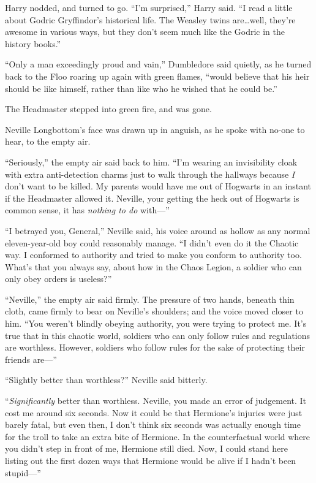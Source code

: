 Harry nodded, and turned to go. “I’m surprised,” Harry said. “I read a little about Godric Gryffindor’s historical life. The Weasley twins are…well, they’re awesome in various ways, but they don’t seem much like the Godric in the history books.”

“Only a man exceedingly proud and vain,” Dumbledore said quietly, as he turned back to the Floo roaring up again with green flames, “would believe that his heir should be like himself, rather than like who he wished that he could be.”

The Headmaster stepped into green fire, and was gone.


Neville Longbottom’s face was drawn up in anguish, as he spoke with no-one to hear, to the empty air.

“Seriously,” the empty air said back to him. “I’m wearing an invisibility cloak with extra anti-detection charms just to walk through the hallways because \emph{I} don’t want to be killed. My parents would have me out of Hogwarts in an instant if the Headmaster allowed it. Neville, your getting the heck out of Hogwarts is common sense, it has \emph{nothing to do} with—”

“I betrayed you, General,” Neville said, his voice around as hollow as any normal eleven-year-old boy could reasonably manage. “I didn’t even do it the Chaotic way. I conformed to authority and tried to make you conform to authority too. What’s that you always say, about how in the Chaos Legion, a soldier who can only obey orders is useless?”

“Neville,” the empty air said firmly. The pressure of two hands, beneath thin cloth, came firmly to bear on Neville’s shoulders; and the voice moved closer to him. “You weren’t blindly obeying authority, you were trying to protect me. It’s true that in this chaotic world, soldiers who can only follow rules and regulations are worthless. However, soldiers who follow rules for the sake of protecting their friends are—”

“Slightly better than worthless?” Neville said bitterly.

“\emph{Significantly} better than worthless. Neville, you made an error of judgement. It cost me around six seconds. Now it could be that Hermione’s injuries were just barely fatal, but even then, I don’t think six seconds was actually enough time for the troll to take an extra bite of Hermione. In the counterfactual world where you didn’t step in front of me, Hermione still died. Now, I could stand here listing out the first dozen ways that Hermione would be alive if I hadn’t been stupid—”

